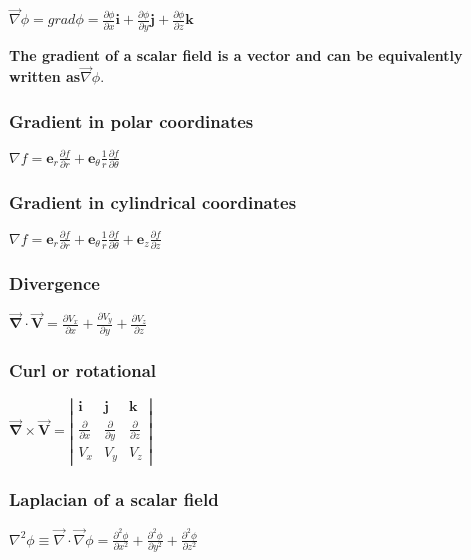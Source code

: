 \documentclass{article}
\begin{document}
\vspace{5pt}

\noindent$\overrightarrow{\nabla}\phi=grad\phi=\frac{\partial\phi}{\partial x}\mathbf{i}+\frac{\partial\phi}{\partial y}\mathbf{j}+\frac{\partial\phi}{\partial z}\mathbf{k}$

\textbf{The gradient of a scalar field is a vector and can be equivalently written as}$\vec{\nabla}\phi$.

\subsubsection{Gradient in polar coordinates}
$\nabla f=\mathbf{e}_r\frac{\partial f}{\partial r} + \mathbf{e}_\theta\frac{1}{r}\frac{\partial f}{\partial \theta}$

\subsubsection{Gradient in cylindrical coordinates}
$\nabla f=\mathbf{e}_r\frac{\partial f}{\partial r} + \mathbf{e}_\theta\frac{1}{r}\frac{\partial f}{\partial \theta} + \mathbf{e}_z\frac{\partial f}{\partial z}$

\subsubsection{Divergence}
$\mathbf{\overrightarrow{\nabla}\cdot \overrightarrow{V}} = \frac{\partial V_x}{\partial x} + \frac{\partial V_y}{\partial y} + \frac{\partial V_z}{\partial z}$

\subsubsection{Curl or rotational}
$\mathbf{\overrightarrow{\nabla} \times \overrightarrow{V}} = \left| \begin{array}{ccc}
    \mathbf{i} & \mathbf{j} & \mathbf{k} \\
    \frac{\partial}{\partial x} & \frac{\partial}{\partial y} & \frac{\partial}{\partial z} \\
    V_x & V_y & V_z
\end{array} \right|$

\subsubsection{Laplacian of a scalar field}
$\nabla^2\phi\equiv\vec{\nabla}\cdot\vec{\nabla}\phi = \frac{\partial^2\phi}{\partial x^2} + \frac{\partial^2\phi}{\partial y^2} + \frac{\partial^2\phi}{\partial z^2}$
\end{document}
